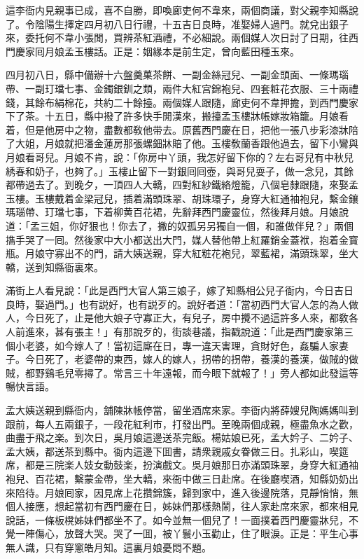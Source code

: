 這李衙内見親事已成，喜不自勝，即喚廊吏何不韋來，兩個商議，對父親李知縣說了。令陰陽生擇定四月初八日行禮，十五吉日良時，准娶婦人過門。就兌出銀子來，委托何不韋小張閒，買辨茶紅酒禮，不必細說。兩個媒人次日討了日期，往西門慶家囘月娘孟玉樓話。正是：姻緣本是前生定，曾向藍田種玉來。

四月初八日，縣中備辦十六盤羹菓茶餅、一副金絲冠兒、一副金頭面、一條瑪瑙帶、一副玎璫七事、金鐲銀釧之類，兩件大紅宫錦袍兒、四套粧花衣服、三十兩禮錢，其餘布絹棉花，共約二十餘擡。兩個媒人跟隨，廊吏何不韋押擔，到西門慶家下了茶。十五日，縣中撥了許多快手閒漢來，搬擡孟玉樓牀帳嫁妝箱籠。月娘看着，但是他房中之物，盡數都敎他带去。原舊西門慶在日，把他一張八步彩漆牀陪了大姐，月娘就把潘金蓮房那張螺鈿牀賠了他。玉樓敎蘭香跟他過去，留下小鸞與月娘看哥兒。月娘不肯，說：「你房中丫頭，我怎好留下你的？左右哥兒有中秋兒綉春和奶子，也夠了。」玉樓止留下一對銀囘囘壺，與哥兒耍子，做一念兒，其餘都帶過去了。到晚夕，一頂四人大轎，四對紅紗鐵絡燈籠，八個皂隸跟隨，來娶孟玉樓。玉樓戴着金梁冠兒，插着滿頭珠翠、胡珠環子，身穿大紅通袖袍兒，繫金鑲瑪瑙帶、玎璫七事，下着柳黄百花裙，先辭拜西門慶靈位，然後拜月娘。月娘說道：「孟三姐，你好狠也！你去了，撇的奴孤另另獨自一個，和誰做伴兒？」兩個㩦手哭了一囘。然後家中大小都送出大門，媒人替他帶上紅羅銷金蓋袱，抱着金寳瓶。月娘守寡出不的門，請大姨送親，穿大紅粧花袍兒，翠藍裙，滿頭珠翠，坐大轎，送到知縣衙裏來。

滿街上人看見說：「此是西門大官人第三娘子，嫁了知縣相公兒子衙内，今日吉日良時，娶過門。」也有説好，也有説歹的。說好者道：「當初西門大官人怎的為人做人，今日死了，止是他大娘子守寡正大，有兒子，房中攪不過這許多人來，都敎各人前進來，甚有張主！」有那說歹的，街談巷議，指戳說道：「此是西門慶家第三個小老婆，如今嫁人了！當初這廝在日，專一違天害理，貪財好色，姦騙人家妻子。今日死了，老婆帶的東西，嫁人的嫁人，拐帶的拐帶，養漢的養漢，做賊的做賊，都野鷄毛兒零撏了。常言三十年遠報，而今眼下就報了！」旁人都如此發這等暢快言語。

孟大姨送親到縣衙内，舖陳牀帳停當，留坐酒席來家。李衙内將薛嫂兒陶媽媽叫到跟前，每人五兩銀子，一段花紅利市，打發出門。至晚兩個成親，極盡魚水之歡，曲盡于飛之楽。到次日，吳月娘這邊送茶完飯。楊姑娘已死，孟大妗子、二妗子、孟大姨，都送茶到縣中。衙内這邊下囬書，請衆親戚女眷做三日。扎彩山，喫筵席，都是三院楽人妓女動鼓楽，扮演戲文。吳月娘那日亦滿頭珠翠，身穿大紅通袖袍兒、百花裙，繫蒙金帶，坐大轎，來衙中做三日赴席。在後廳喫酒，知縣奶奶出來陪待。月娘囘家，因見席上花攢錦簇，歸到家中，進入後邊院落，見靜悄悄，無個人接應，想起當初有西門慶在日，姊妹們那樣熱鬧，往人家赴席來家，都來相見說話，一條板櫈姊妹們都坐不了。如今並無一個兒了！一面撲着西門慶靈牀兒，不覺一陣傷心，放聲大哭。哭了一囬，被丫鬟小玉勸止，住了眼淚。正是：平生心事無人識，只有穿窻皓月知。這裏月娘憂悶不題。

